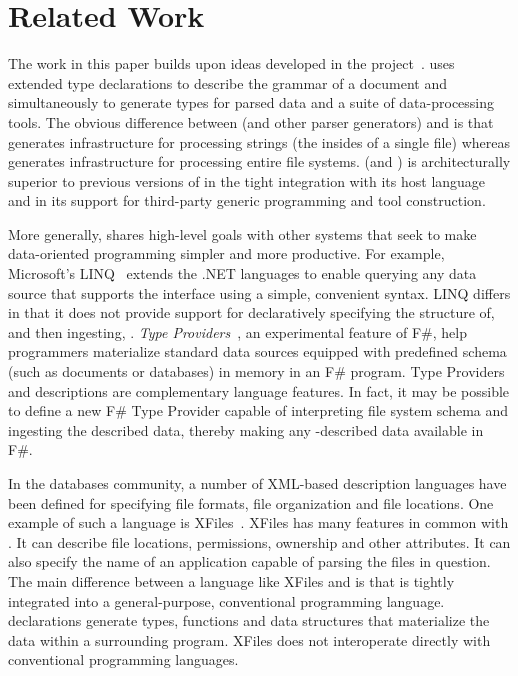 \section{Related Work}
\label{sec:related}

The work in this paper builds upon ideas developed in the \pads{} 
project~\cite{fisher+:pads,fisher+:toplas}. \pads{} uses extended
type declarations to describe the grammar of a document
and simultaneously to generate types for parsed data and a suite 
of data-processing tools.  The obvious difference between 
\pads{} (and other parser generators) and
\forest{} is that 
\pads{} generates infrastructure for processing strings (the insides
of a single file) whereas \forest{} generates infrastructure for 
processing entire file systems.
\forest{} (and \padshaskell) is architecturally superior to 
previous versions of \pads{} in the tight integration with its host
language and
in its support for third-party generic programming and tool construction.

More generally, \forest{} shares high-level goals with other systems
that seek to make data-oriented programming simpler and more productive.
For example, Microsoft's LINQ~\cite{linq} extends the .NET languages
to enable querying
any data source that supports the  interface using
a simple, convenient syntax.  
LINQ differs in that it does not provide support for
declaratively specifying the structure of, and then ingesting, 
\filestores{}. {\em Type Providers}~\cite{syme+:type-providers}, an
experimental feature 
of F\#, help programmers materialize standard data sources equipped with
predefined schema (such as \xml{} documents or databases) in memory in
an F\# program.  Type Providers and \forest{} descriptions
are complementary language
features.  In fact, it may be possible to define a new F\# Type Provider
capable of interpreting \forest{} file system schema and ingesting
the described data, thereby making any \forest{}-described data available
in F\#.

In the databases community, a number of XML-based
description languages have been defined for specifying
file formats, file organization and file locations.
One example of such a language is XFiles~\cite{xml-file-sys}.
XFiles has many features in common with \forest{}.  It can
describe file locations, permissions, ownership and other
attributes.  It can also specify the name of an application capable of
parsing the files in question.  The main difference between
a language like XFiles and \forest{} is that \forest{} is
tightly integrated into a general-purpose, conventional programming
language.  \forest{} declarations generate types, functions
and data structures that materialize the data within
a surrounding \haskell{} program. XFiles does not interoperate
directly with conventional programming languages. 
